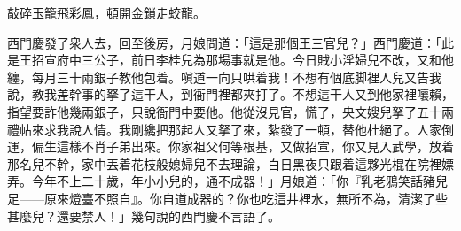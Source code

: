 \begin{myquote} 
敲碎玉籠飛彩鳳，頓開金鎖走蛟龍。
\end{myquote} 

西門慶發了衆人去，回至後房，月娘問道：「這是那個王三官兒？」西門慶道：「此是王招宣府中三公子，前日李桂兒為那場事就是他。{}今日賊小淫婦兒不改，又和他纏，每月三十兩銀子教他包着。嗔道一向只哄着我！不想有個底脚裡人兒又告我說，教我差幹事的拏了這干人，到衙門裡都夾打了。不想這干人又到他家裡嚷賴，指望要詐他幾兩銀子，只說衙門中要他。他從沒見官，慌了，央文嫂兒拏了五十兩禮帖來求我說人情。我剛纔把那起人又拏了來，紮發了一頓，替他杜絕了。人家倒運，偏生這樣不肖子弟出來。你家祖父何等根基，又做招宣，你又見入武學，放着那名兒不幹，家中丟着花枝般媳婦兒不去理論，白日黑夜只跟着這夥光棍在院裡嫖弄。今年不上二十歲，年小小兒的，通不成器！」{}月娘道：「你『乳老鴉笑話豬兒足——原來燈臺不照自』。你自道成器的？你也吃這井裡水，無所不為，清潔了些甚麼兒？還要禁人！」幾句說的西門慶不言語了。

